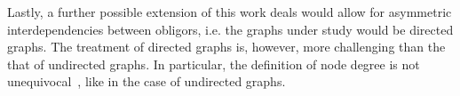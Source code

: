 Lastly, a further possible extension of this work deals would allow for asymmetric interdependencies between obligors, i.e. the graphs under study would be directed graphs.
The treatment of directed graphs is, however, more challenging than the that of undirected graphs.
In particular, the definition of node degree is not unequivocal~\cite{newman2010networks}, like in the case of undirected graphs.




